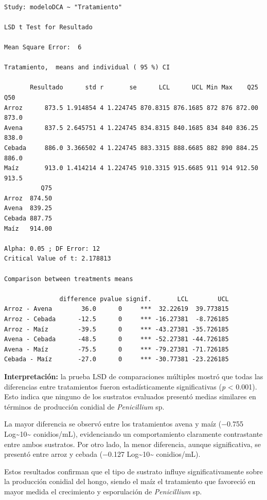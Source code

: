\documentclass[
  spanish,
  letterpaper,
  DIV=11,
  numbers=noendperiod]{scrreprt}
\begin{document}
\begin{verbatim}

Study: modeloDCA ~ "Tratamiento"

LSD t Test for Resultado 

Mean Square Error:  6 

Tratamiento,  means and individual ( 95 %) CI

       Resultado      std r       se      LCL      UCL Min Max    Q25   Q50
Arroz      873.5 1.914854 4 1.224745 870.8315 876.1685 872 876 872.00 873.0
Avena      837.5 2.645751 4 1.224745 834.8315 840.1685 834 840 836.25 838.0
Cebada     886.0 3.366502 4 1.224745 883.3315 888.6685 882 890 884.25 886.0
Maíz       913.0 1.414214 4 1.224745 910.3315 915.6685 911 914 912.50 913.5
          Q75
Arroz  874.50
Avena  839.25
Cebada 887.75
Maíz   914.00

Alpha: 0.05 ; DF Error: 12
Critical Value of t: 2.178813 

Comparison between treatments means

               difference pvalue signif.       LCL        UCL
Arroz - Avena        36.0      0     ***  32.22619  39.773815
Arroz - Cebada      -12.5      0     *** -16.27381  -8.726185
Arroz - Maíz        -39.5      0     *** -43.27381 -35.726185
Avena - Cebada      -48.5      0     *** -52.27381 -44.726185
Avena - Maíz        -75.5      0     *** -79.27381 -71.726185
Cebada - Maíz       -27.0      0     *** -30.77381 -23.226185
\end{verbatim}

\textbf{Interpretación:} la prueba LSD de comparaciones múltiples mostró
que todas las diferencias entre tratamientos fueron estadísticamente
significativas (\emph{p} \textless{} 0.001). Esto indica que ninguno de
los sustratos evaluados presentó medias similares en términos de
producción conidial de \emph{Penicillium} sp.

La mayor diferencia se observó entre los tratamientos avena y maíz
(−0.755 Log\textasciitilde10\textasciitilde{} conidios/mL), evidenciando
un comportamiento claramente contrastante entre ambos sustratos. Por
otro lado, la menor diferencia, aunque significativa, se presentó entre
arroz y cebada (−0.127 Log\textasciitilde10\textasciitilde{}
conidios/mL).

Estos resultados confirman que el tipo de sustrato influye
significativamente sobre la producción conidial del hongo, siendo el
maíz el tratamiento que favoreció en mayor medida el crecimiento y
esporulación de \emph{Penicillium} sp.
\end{document}
